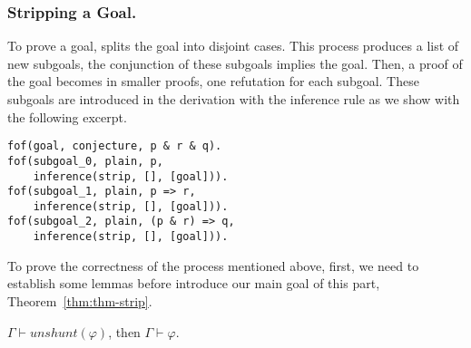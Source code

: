 \documentclass[../main.tex]{subfiles}
\begin{document}
\subsubsection{Stripping a Goal.}
\label{sssec:strip-a-goal}

To prove a goal, \Metis splits the goal into
disjoint cases. This process produces a list of new subgoals, the
conjunction of these subgoals implies the goal. Then, a proof of the
goal becomes in smaller proofs, one refutation for each subgoal.
These subgoals are introduced in the \TSTP derivation with the \strip
inference rule as we show with the following excerpt.

\begin{verbatim}
fof(goal, conjecture, p & r & q).
fof(subgoal_0, plain, p,
    inference(strip, [], [goal])).
fof(subgoal_1, plain, p => r,
    inference(strip, [], [goal])).
fof(subgoal_2, plain, (p & r) => q,
    inference(strip, [], [goal])).
\end{verbatim}

To prove the correctness of the process mentioned above, first,
we need to establish some lemmas before introduce our main goal of this part,
Theorem~\ref{thm:thm-strip}.

\begin{lemma}
  \label{lem:unshunt}
  $Γ ⊢ unshunt(φ)$, then $Γ ⊢ φ$.
\end{lemma}
\end{document}
